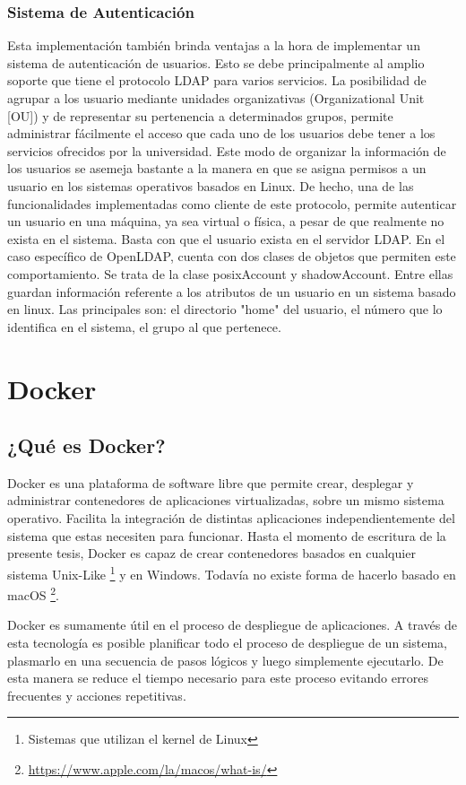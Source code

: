 \subsubsection{Sistema de Autenticación}
Esta implementación también brinda ventajas a la hora de implementar un sistema de 
autenticación de usuarios. Esto se debe principalmente al amplio soporte que tiene el protocolo 
LDAP para varios servicios. La posibilidad de agrupar a los usuario mediante unidades 
organizativas (Organizational Unit [OU]) y de representar su pertenencia a determinados 
grupos, permite administrar fácilmente el acceso que cada uno de los usuarios 
debe tener a los servicios ofrecidos por la universidad. Este modo de organizar la información 
de los usuarios se asemeja bastante a la manera en que se asigna permisos a un usuario en los 
sistemas operativos basados en Linux. De hecho, una de las funcionalidades implementadas 
como cliente de este protocolo, permite autenticar un usuario en una máquina, ya sea virtual o 
física, a pesar de que realmente no exista en el sistema. Basta con que el usuario exista en el 
servidor LDAP. En el caso específico de OpenLDAP, cuenta con dos clases de objetos que permiten
este comportamiento. Se trata de la clase posixAccount y shadowAccount. Entre ellas guardan 
información referente a los atributos de un usuario en un sistema basado en linux. Las principales
son: el directorio "home" del usuario, el número que lo identifica en el sistema, el grupo al que 
pertenece.


\section{Docker}

\subsection{¿Qué es Docker?}
Docker es una plataforma de software libre que permite crear, desplegar y administrar 
contenedores de aplicaciones virtualizadas, sobre un mismo sistema operativo. Facilita la 
integración de distintas aplicaciones independientemente del sistema que estas necesiten para
funcionar. Hasta el momento de escritura de la presente tesis, Docker es capaz de crear 
contenedores basados en cualquier sistema Unix-Like \footnote{ Sistemas que utilizan el kernel de
Linux} y en Windows. Todavía no existe forma de hacerlo basado en macOS \footnote{ 
\url{https://www.apple.com/la/macos/what-is/}}.

Docker es sumamente útil en el proceso de despliegue de aplicaciones. A través de esta tecnología
es posible planificar todo el proceso de despliegue de un sistema, plasmarlo en una secuencia de
pasos lógicos y luego simplemente ejecutarlo. De esta manera se reduce el tiempo necesario para
este proceso evitando errores frecuentes y acciones repetitivas.

